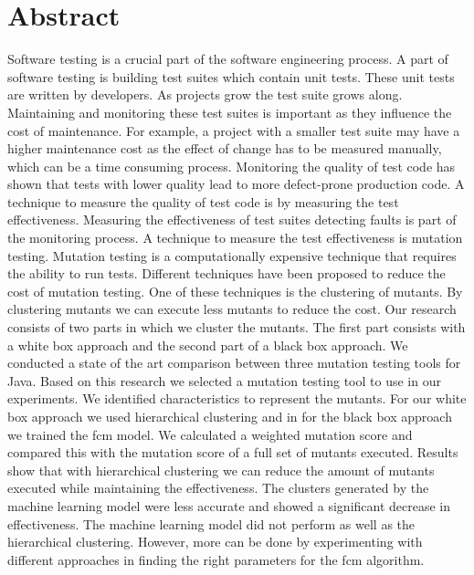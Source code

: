 \documentclass[../main]{subfiles}
\begin{document}
\chapter*{Abstract}
Software testing is a crucial part of the software engineering process. 
A part of software testing is building test suites which contain unit tests.
These unit tests are written by developers. 
As projects grow the test suite grows along.
Maintaining and monitoring these test suites is important as they influence the cost of maintenance.
For example, a project with a smaller test suite may have a higher maintenance cost as the effect of change has to be measured manually, which can be a time consuming process.
Monitoring the quality of test code has shown that tests with lower quality lead to more defect-prone production code.
A technique to measure the quality of test code is by measuring the test effectiveness.
\newline
Measuring the effectiveness of test suites detecting faults is part of the monitoring process.
A technique to measure the test effectiveness is mutation testing.
Mutation testing is a computationally expensive technique that requires the ability to run tests.
Different techniques have been proposed to reduce the cost of mutation testing.
One of these techniques is the clustering of mutants.
By clustering mutants we can execute less mutants to reduce the cost.
\newline
Our research consists of two parts in which we cluster the mutants.
The first part consists with a white box approach and the second part of a black box approach.
We conducted a state of the art comparison between three mutation testing tools for Java.
Based on this research we selected a mutation testing tool to use in our experiments.
\newline
We identified characteristics to represent the mutants.
For our white box approach we used hierarchical clustering and in for the black box approach we trained the \acrlong{fcm} model.
We calculated a weighted mutation score and compared this with the mutation score of a full set of mutants executed.
Results show that with hierarchical clustering we can reduce the amount of mutants executed while maintaining the effectiveness.
The clusters generated by the machine learning model were less accurate and showed a significant decrease in effectiveness.
The machine learning model did not perform as well as the hierarchical clustering.
However, more can be done by experimenting with different approaches in finding the right parameters for the \acrlong{fcm} algorithm. 
\end{document}
